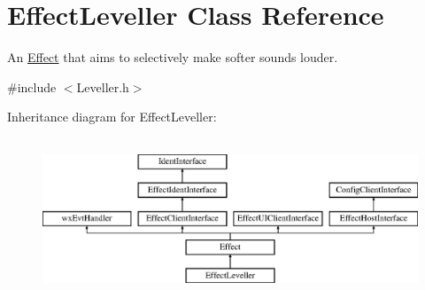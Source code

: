 \hypertarget{class_effect_leveller}{}\section{Effect\+Leveller Class Reference}
\label{class_effect_leveller}


An \hyperlink{class_effect}{Effect} that aims to selectively make softer sounds louder.  




{\ttfamily \#include $<$Leveller.\+h$>$}

Inheritance diagram for Effect\+Leveller\+:\begin{figure}[H]
\begin{center}
\leavevmode
\includegraphics[height=4.794520cm]{class_effect_leveller}
\end{center}
\end{figure}
